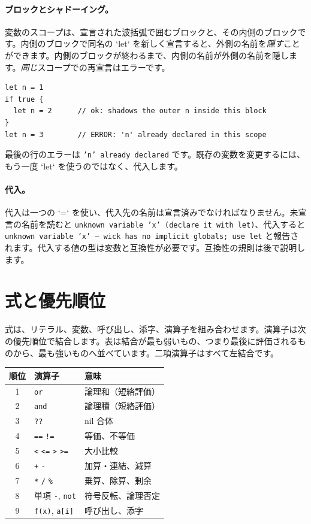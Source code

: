 \paragraph{ブロックとシャドーイング。} 変数のスコープは、宣言された波括弧で囲むブロックと、その内側のブロックです。内側のブロックで同名の `let` を新しく宣言すると、外側の名前を\emph{隠す}ことができます。内側のブロックが終わるまで、内側の名前が外側の名前を隠します。\emph{同じ}スコープでの再宣言はエラーです。

\begin{lstlisting}[language=wick]
let n = 1
if true {
  let n = 2      // ok: shadows the outer n inside this block
}
let n = 3        // ERROR: 'n' already declared in this scope
\end{lstlisting}

\noindent
最後の行のエラーは \texttt{'n' already declared} です。既存の変数を変更するには、もう一度 `let` を使うのではなく、代入します。

\paragraph{代入。} 代入は一つの `=` を使い、代入先の名前は宣言済みでなければなりません。未宣言の名前を読むと \texttt{unknown variable 'x' (declare it with let)}、代入すると \texttt{unknown variable 'x' --- wick has no implicit globals; use let} と報告されます。代入する値の型は変数と互換性が必要です。互換性の規則は後で説明します。

\section{式と優先順位}

式は、リテラル、変数、呼び出し、添字、演算子を組み合わせます。演算子は次の優先順位で結合します。表は結合が最も弱いもの、つまり最後に評価されるものから、最も強いものへ並べています。二項演算子はすべて左結合です。

\begin{center}
\begin{tabular}{@{}cll@{}}
\toprule
\textbf{順位} & \textbf{演算子} & \textbf{意味} \\
\midrule
1 & \texttt{or} & 論理和（短絡評価） \\
2 & \texttt{and} & 論理積（短絡評価） \\
3 & \texttt{??} & nil 合体 \\
4 & \texttt{==} \quad \texttt{!=} & 等価、不等価 \\
5 & \texttt{<} \enskip \texttt{<=} \enskip \texttt{>} \enskip \texttt{>=} & 大小比較 \\
6 & \texttt{+} \quad \texttt{-} & 加算・連結、減算 \\
7 & \texttt{*} \enskip \texttt{/} \enskip \texttt{\%} & 乗算、除算、剰余 \\
8 & 単項 \texttt{-}, \texttt{not} & 符号反転、論理否定 \\
9 & \texttt{f(x)}, \texttt{a[i]} & 呼び出し、添字 \\
\bottomrule
\end{tabular}
\end{center}

